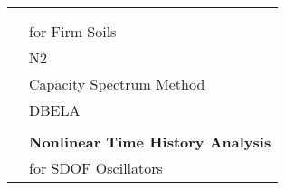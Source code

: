 \begin{table}[!htbp]
\begin{tabular}{|l|l|}
                    & \citet{VidicEtAl1994} \\
                    & \citet{LinMiranda2008} \\
                    & \citet{Miranda2000} for Firm Soils \\
                    & N2 \citep{CEN2005} \\
                    & Capacity Spectrum Method \citep{FEMA4402005} \\
                    & DBELA \citep{SilvaEtAl2013} \\
                    & \\
                    & \textbf{Nonlinear Time History Analysis} \\
                    & for SDOF Oscillators \\ \hline
\end{tabular}
\label{tab:current_features}

\end{table}